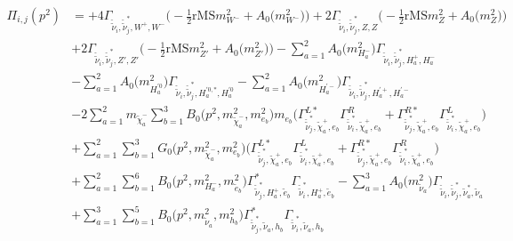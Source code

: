 \begin{itemize}
\begin{align} 
\Pi_{i,j}(p^2) &= +4 {\Gamma_{\check{\tilde{\nu}}_{{i}},\check{\tilde{\nu}}^*_{{j}},W^+,W^-}} \Big(-\frac{1}{2} \text{rMS} m^2_{W^-}  + {A_0\Big(m^2_{W^-}\Big)}\Big)+2 {\Gamma_{\check{\tilde{\nu}}_{{i}},\check{\tilde{\nu}}^*_{{j}},Z,Z}} \Big(-\frac{1}{2} \text{rMS} m^2_{Z}  + {A_0\Big(m^2_{Z}\Big)}\Big)\nonumber \\ 
 &+2 {\Gamma_{\check{\tilde{\nu}}_{{i}},\check{\tilde{\nu}}^*_{{j}},{Z'},{Z'}}} \Big(-\frac{1}{2} \text{rMS} m^2_{{Z'}}  + {A_0\Big(m^2_{{Z'}}\Big)}\Big)- \sum_{a=1}^{2}{A_0\Big(m^2_{H^-_{{a}}}\Big)} {\Gamma_{\check{\tilde{\nu}}_{{i}},\check{\tilde{\nu}}^*_{{j}},H^+_{{a}},H^-_{{a}}}}  \nonumber \\ 
 &- \sum_{a=1}^{2}{A_0\Big(m^2_{H^{'0}_{{a}}}\Big)} {\Gamma_{\check{\tilde{\nu}}_{{i}},\check{\tilde{\nu}}^*_{{j}},H^{{'0},*}_{{a}},H^{'0}_{{a}}}}  - \sum_{a=1}^{2}{A_0\Big(m^2_{H^{'-}_{{a}}}\Big)} {\Gamma_{\check{\tilde{\nu}}_{{i}},\check{\tilde{\nu}}^*_{{j}},H^{'+}_{{a}},H^{'-}_{{a}}}}  \nonumber \\ 
 &-2 \sum_{a=1}^{2}m_{\tilde{\chi}^-_{{a}}} \sum_{b=1}^{3}{B_0\Big(p^{2},m^2_{\tilde{\chi}^-_{{a}}},m^2_{e_{{b}}}\Big)} m_{e_{{b}}} \Big({\Gamma^{L*}_{\check{\tilde{\nu}}^*_{{j}},\tilde{\chi}^+_{{a}},e_{{b}}}} {\Gamma^R_{\check{\tilde{\nu}}^*_{{i}},\tilde{\chi}^+_{{a}},e_{{b}}}}  + {\Gamma^{R*}_{\check{\tilde{\nu}}^*_{{j}},\tilde{\chi}^+_{{a}},e_{{b}}}} {\Gamma^L_{\check{\tilde{\nu}}^*_{{i}},\tilde{\chi}^+_{{a}},e_{{b}}}} \Big)  \nonumber \\ 
 &+\sum_{a=1}^{2}\sum_{b=1}^{3}{G_0\Big(p^{2},m^2_{\tilde{\chi}^-_{{a}}},m^2_{e_{{b}}}\Big)} \Big({\Gamma^{L*}_{\check{\tilde{\nu}}^*_{{j}},\tilde{\chi}^+_{{a}},e_{{b}}}} {\Gamma^L_{\check{\tilde{\nu}}^*_{{i}},\tilde{\chi}^+_{{a}},e_{{b}}}}  + {\Gamma^{R*}_{\check{\tilde{\nu}}^*_{{j}},\tilde{\chi}^+_{{a}},e_{{b}}}} {\Gamma^R_{\check{\tilde{\nu}}^*_{{i}},\tilde{\chi}^+_{{a}},e_{{b}}}} \Big)\nonumber \\ 
 &+\sum_{a=1}^{2}\sum_{b=1}^{6}{B_0\Big(p^{2},m^2_{H^-_{{a}}},m^2_{\tilde{e}_{{b}}}\Big)} {\Gamma^*_{\check{\tilde{\nu}}^*_{{j}},H^+_{{a}},\tilde{e}_{{b}}}} {\Gamma_{\check{\tilde{\nu}}^*_{{i}},H^+_{{a}},\tilde{e}_{{b}}}} - \sum_{a=1}^{3}{A_0\Big(m^2_{\tilde{\nu}_{{a}}}\Big)} {\Gamma_{\check{\tilde{\nu}}_{{i}},\check{\tilde{\nu}}^*_{{j}},\tilde{\nu}^*_{{a}},\tilde{\nu}_{{a}}}}  \nonumber \\ 
 &+\sum_{a=1}^{3}\sum_{b=1}^{5}{B_0\Big(p^{2},m^2_{\tilde{\nu}_{{a}}},m^2_{h_{{b}}}\Big)} {\Gamma^*_{\check{\tilde{\nu}}^*_{{j}},\tilde{\nu}_{{a}},h_{{b}}}} {\Gamma_{\check{\tilde{\nu}}^*_{{i}},\tilde{\nu}_{{a}},h_{{b}}}} \nonumber \\ 

\end{align}
\end{itemize}
